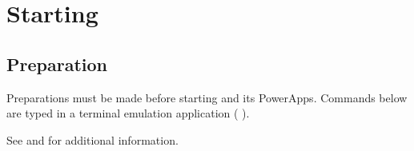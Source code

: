 %
% 
% 
% 
% 
% 
%


%

\chapter{Starting \sr{}}
\label{ch:startingup}


\section{Preparation}
\label{sec:prepare}

Preparations must be made before starting \sr{} and its PowerApps.
Commands below are typed in a terminal emulation application (\eg{}
).

See  and  for additional information.
  
\newcommand{\srwindow}{%
  \centerline{\texttt{[image: Figures/srwindow-1.eps.gz]}}
}
\begin{htmlonly}
  \newcommand{\srwindow}{%
    \htmladdimg[alt="SCIRun Window"]{../Figures/srwindow-1.gif}
  }
\end{htmlonly}

